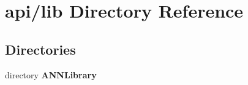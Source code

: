 \section{api/lib Directory Reference}
\label{dir_f457810b66afd2dafe290771b7d8d49e}
\subsection*{Directories}
\begin{DoxyCompactItemize}
\item 
directory {\bf A\+N\+N\+Library}
\end{DoxyCompactItemize}
